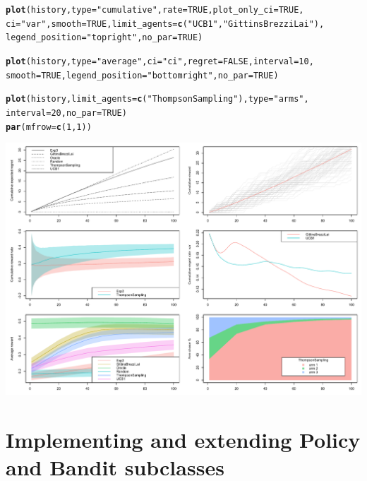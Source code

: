 \documentclass{jss}\usepackage[]{graphicx}\usepackage[]{color}
\makeatletter
\newcommand{\hlnum}[1]{\textcolor[rgb]{0.686,0.059,0.569}{#1}}%
\newcommand{\hlstr}[1]{\textcolor[rgb]{0.192,0.494,0.8}{#1}}%
\newcommand{\hlstd}[1]{\textcolor[rgb]{0.345,0.345,0.345}{#1}}%
\newcommand{\hlkwc}[1]{\textcolor[rgb]{0.333,0.667,0.333}{#1}}%
\newcommand{\hlkwd}[1]{\textcolor[rgb]{0.737,0.353,0.396}{\textbf{#1}}}%
\newenvironment{kframe}{%
 \def\at@end@of@kframe{}%
 \ifinner\ifhmode%
  \def\at@end@of@kframe{\end{minipage}}%
  \begin{minipage}{\columnwidth}%
 \fi\fi%
 \def\FrameCommand##1{\hskip\@totalleftmargin \hskip-\fboxsep
 \colorbox{shadecolor}{##1}\hskip-\fboxsep
     \hskip-\linewidth \hskip-\@totalleftmargin \hskip\columnwidth}%
 \MakeFramed {\advance\hsize-\width
   \@totalleftmargin\z@ \linewidth\hsize
   \@setminipage}}%
 {\par\unskip\endMakeFramed%
 \at@end@of@kframe}
\newenvironment{knitrout}{}{} %
\makeatother
\begin{document}
\begin{knitrout}
\begin{kframe}
\begin{alltt}
\hlkwd{plot}\hlstd{(history,} \hlkwc{type} \hlstd{=} \hlstr{"cumulative"}\hlstd{,} \hlkwc{rate} \hlstd{=} \hlnum{TRUE}\hlstd{,} \hlkwc{plot_only_ci} \hlstd{=} \hlnum{TRUE}\hlstd{,}
     \hlkwc{ci} \hlstd{=} \hlstr{"var"}\hlstd{,} \hlkwc{smooth} \hlstd{=} \hlnum{TRUE}\hlstd{,} \hlkwc{limit_agents} \hlstd{=} \hlkwd{c}\hlstd{(}\hlstr{"UCB1"}\hlstd{,} \hlstr{"GittinsBrezziLai"}\hlstd{),}
     \hlkwc{legend_position} \hlstd{=} \hlstr{"topright"}\hlstd{,} \hlkwc{no_par} \hlstd{=} \hlnum{TRUE}\hlstd{)}

\hlkwd{plot}\hlstd{(history,} \hlkwc{type} \hlstd{=} \hlstr{"average"}\hlstd{,} \hlkwc{ci} \hlstd{=} \hlstr{"ci"}\hlstd{,} \hlkwc{regret} \hlstd{=} \hlnum{FALSE}\hlstd{,} \hlkwc{interval} \hlstd{=} \hlnum{10}\hlstd{,}
     \hlkwc{smooth} \hlstd{=} \hlnum{TRUE}\hlstd{,} \hlkwc{legend_position} \hlstd{=} \hlstr{"bottomright"}\hlstd{,} \hlkwc{no_par} \hlstd{=} \hlnum{TRUE}\hlstd{)}

\hlkwd{plot}\hlstd{(history,} \hlkwc{limit_agents} \hlstd{=} \hlkwd{c}\hlstd{(}\hlstr{"ThompsonSampling"}\hlstd{),} \hlkwc{type} \hlstd{=} \hlstr{"arms"}\hlstd{,}
     \hlkwc{interval} \hlstd{=} \hlnum{20}\hlstd{,} \hlkwc{no_par} \hlstd{=} \hlnum{TRUE}\hlstd{)}
\hlkwd{par}\hlstd{(}\hlkwc{mfrow} \hlstd{=} \hlkwd{c}\hlstd{(}\hlnum{1}\hlstd{,} \hlnum{1}\hlstd{))}
\end{alltt}
\end{kframe}
\end{knitrout}
\includegraphics[width=\textwidth]{fig/plot_examples}

\section{Implementing and extending Policy and Bandit subclasses}
\end{document}
